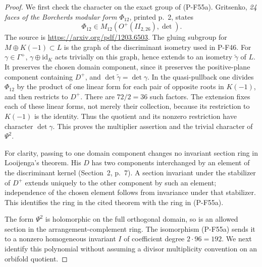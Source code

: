 \documentclass[11pt,a4paper]{article}
\begin{document}
\begin{proof}
We first check the character on the exact group of (P-F55a).
Gritsenko, \emph{24 faces of the Borcherds modular form
$\Phi_{12}$}, printed p.~2, states
\[
             \Phi_{12}\in M_{12}(O^+(II_{2,26}),\det).
\]
The source is \url{https://arxiv.org/pdf/1203.6503}.
The gluing subgroup for
$M\oplus K(-1)\subset L$ is the graph of the discriminant
isometry used in P-F46. For $\gamma\in\Gamma^+$,
$\gamma\oplus\mathrm{id}_K$ acts trivially on this graph, hence
extends to an isometry $\widetilde\gamma$ of $L$.
It preserves the chosen domain component, since it preserves
the positive-plane component containing $D^+$, and
$\det\widetilde\gamma=\det\gamma$.
In the quasi-pullback one divides $\Phi_{12}$ by the product
of one linear form for each pair of opposite roots in $K(-1)$,
and then restricts to $D^+$. There are $72/2=36$ such factors.
The extension fixes each of these linear forms, not merely
their collection, because its restriction to $K(-1)$ is the
identity. Thus the quotient and its nonzero restriction have
character $\det\gamma$. This proves the multiplier assertion
and the trivial character of $\Psi^2$.

For clarity, passing to one domain component changes no invariant
section ring in Looijenga's theorem. His $D$ has two components
interchanged by an element of the discriminant kernel
(Section~2, p.~7). A section invariant under the stabilizer
of $D^+$ extends uniquely to the other component by such an
element; independence of the chosen element follows from
invariance under that stabilizer. This identifies the ring in
the cited theorem with the ring in (P-F55a).

The form $\Psi^2$ is holomorphic on the full orthogonal domain,
so is an allowed section in the arrangement-complement ring.
The isomorphism (P-F55a) sends it to a nonzero homogeneous
invariant $I$ of coefficient degree $2\cdot96=192$.
We next identify this polynomial without assuming a divisor
multiplicity convention on an orbifold quotient.


\end{proof}
\end{document}
